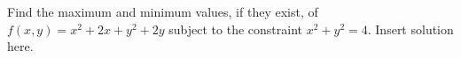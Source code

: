 {Find the maximum and minimum values, if they exist, of $f(x,y) = x^2 + 2x + y^2 + 2y$ subject to the constraint $x^2 + y^2 = 4.$
}
{Insert solution here.
}

